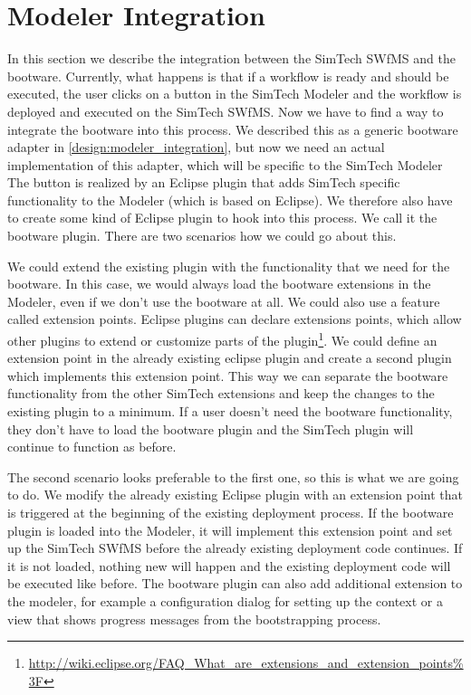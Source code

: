 \section{Modeler Integration}
\label{implementation:modeler_integration}

In this section we describe the integration between the SimTech SWfMS and the bootware.
Currently, what happens is that if a workflow is ready and should be executed, the user clicks on a button in the SimTech Modeler and the workflow is deployed and executed on the SimTech SWfMS.
Now we have to find a way to integrate the bootware into this process.
We described this as a generic bootware adapter in \autoref{design:modeler_integration}, but now we need an actual implementation of this adapter, which will be specific to the SimTech Modeler
The button is realized by an Eclipse plugin that adds SimTech specific functionality to the Modeler (which is based on Eclipse).
We therefore also have to create some kind of Eclipse plugin to hook into this process.
We call it the bootware plugin.
There are two scenarios how we could go about this.

We could extend the existing plugin with the functionality that we need for the bootware.
In this case, we would always load the bootware extensions in the Modeler, even if we don't use the bootware at all.
We could also use a feature called extension points.
Eclipse plugins can declare extensions points, which allow other plugins to extend or customize parts of the plugin\footnote{\url{http://wiki.eclipse.org/FAQ_What_are_extensions_and_extension_points\%3F}}.
We could define an extension point in the already existing eclipse plugin and create a second plugin which implements this extension point.
This way we can separate the bootware functionality from the other SimTech extensions and keep the changes to the existing plugin to a minimum.
If a user doesn't need the bootware functionality, they don't have to load the bootware plugin and the SimTech plugin will continue to function as before.

The second scenario looks preferable to the first one, so this is what we are going to do.
We modify the already existing Eclipse plugin with an extension point that is triggered at the beginning of the existing deployment process.
If the bootware plugin is loaded into the Modeler, it will implement this extension point and set up the SimTech SWfMS before the already existing deployment code continues.
If it is not loaded, nothing new will happen and the existing deployment code will be executed like before.
The bootware plugin can also add additional extension to the modeler, for example a configuration dialog for setting up the context or a view that shows progress messages from the bootstrapping process.
